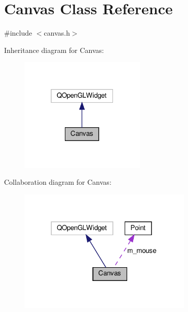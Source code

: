 \hypertarget{class_canvas}{}\section{Canvas Class Reference}
\label{class_canvas}


{\ttfamily \#include $<$canvas.\+h$>$}



Inheritance diagram for Canvas\+:
\nopagebreak
\begin{figure}[H]
\begin{center}
\leavevmode
\includegraphics[width=171pt]{class_canvas__inherit__graph}
\end{center}
\end{figure}


Collaboration diagram for Canvas\+:
\nopagebreak
\begin{figure}[H]
\begin{center}
\leavevmode
\includegraphics[width=236pt]{class_canvas__coll__graph}
\end{center}
\end{figure}

